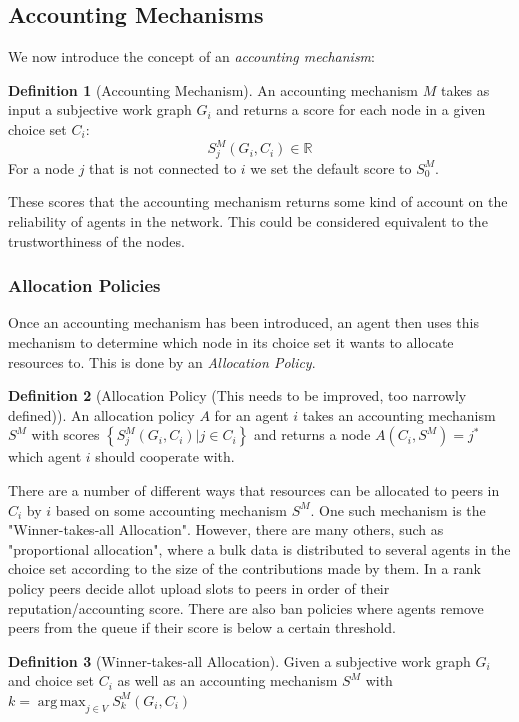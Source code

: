\documentclass[11pt,a4paper]{article}
\theoremstyle{definition}
\newtheorem{definition}{Definition}[section]
\theoremstyle{theorem}
\theoremstyle{proposition}
\theoremstyle{corollary}
\theoremstyle{lemma}
\theoremstyle{example}
\theoremstyle{remark}
\DeclareMathOperator*{\argmax}{arg\,max}
\begin{document}
\subsection{Accounting Mechanisms}
\label{subsec:Accounting Mechanisms}
We now introduce the concept of an {\it accounting mechanism}:
\begin{definition}[Accounting Mechanism]
An accounting mechanism $M$ takes as input a subjective work graph $G_i$ and returns a score for each node in a given choice set $C_i$:
\[
S_j^M(G_i,C_i)\in\mathbb{R}
\]
For a node $j$ that is not connected to $i$ we set the default score to $S_0^M$. 
\end{definition}
These scores that the accounting mechanism returns some kind of account on the reliability of agents in the network. This could be considered equivalent to the trustworthiness of the nodes. 



\subsubsection{Allocation Policies}
\label{subsubsec:Allocation Policies}
Once an accounting mechanism has been introduced, an agent then uses this mechanism to determine which node in its choice set it wants to allocate resources to. This is done by an {\it Allocation Policy}.

\begin{definition}[Allocation Policy (This needs to be improved, too narrowly defined)]
An allocation policy $A$ for an agent $i$ takes an accounting mechanism $S^M$ with scores $\left\lbrace{}S_j^M(G_i,C_i)|j\in{}C_i\right\rbrace$ and returns a node $A(C_i,S^M)=j^{*}$ which agent $i$ should cooperate with.  
\end{definition}

There are a number of different ways that resources can be allocated to peers in $C_i$ by $i$ based on some accounting mechanism $S^M$. One such mechanism is the "Winner-takes-all Allocation". However, there are many others, such as "proportional allocation", where a bulk data is distributed to several agents in the choice set according to the size of the contributions made by them. In a rank policy peers decide allot upload slots to peers in order of their reputation/accounting score. There are also ban policies where agents remove peers from the queue if their score is below a certain threshold.  

\begin{definition}[Winner-takes-all Allocation]
Given a subjective work graph $G_i$ and choice set $C_i$ as well as an accounting mechanism $S^M$ with $k=\argmax_{j\in{}V}S_k^M(G_i,C_i)$
\end{definition}
\end{document}
